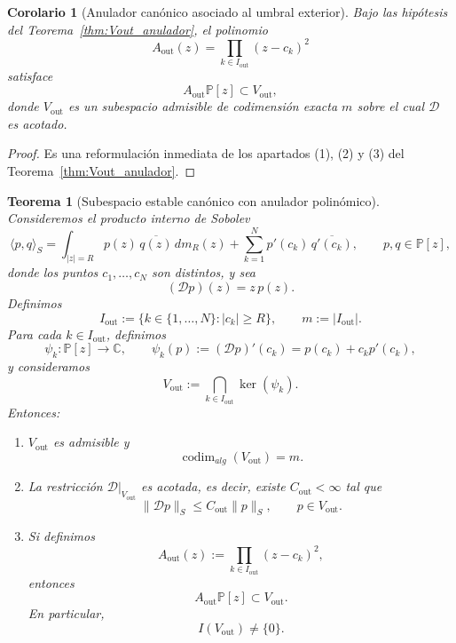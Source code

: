 \documentclass[12pt,a4paper]{article}
\newtheorem{theorem}{Teorema}
\newtheorem{corollary}{Corolario}
\theoremstyle{definition}
\theoremstyle{remark}
\begin{document}
\begin{corollary}[Anulador canónico asociado al umbral exterior]
	\label{cor:anulador_canonico_umbral}
	Bajo las hipótesis del Teorema~\ref{thm:Vout_anulador}, el polinomio
	\[
		A_{\mathrm{out}}(z)=\prod_{k\in I_{\mathrm{out}}}(z-c_k)^2
	\]
	satisface
	\[
		A_{\mathrm{out}}\mathbb P[z]\subset V_{\mathrm{out}},
	\]
	donde $V_{\mathrm{out}}$ es un subespacio admisible de codimensión exacta $m$
	sobre el cual $\mathcal D$ es acotado.
\end{corollary}

\begin{proof}
	Es una reformulación inmediata de los apartados (1), (2) y (3) del
	Teorema~\ref{thm:Vout_anulador}.
\end{proof}

\begin{theorem}[Subespacio estable canónico con anulador polinómico]
	\label{thm:subespacio_canonico_anulador}
	Consideremos el producto interno de Sobolev
	\[
		\langle p,q\rangle_S
		=
		\int_{|z|=R} p(z)\,\overline{q(z)}\,dm_R(z)
		+
		\sum_{k=1}^N p'(c_k)\,\overline{q'(c_k)},
		\qquad p,q\in\mathbb P[z],
	\]
	donde los puntos $c_1,\dots,c_N$ son distintos, y sea
	\[
		(\mathcal Dp)(z)=z\,p(z).
	\]
	Definimos
	\[
		I_{\mathrm{out}}:=\{k\in\{1,\dots,N\}:|c_k|\ge R\},
		\qquad
		m:=|I_{\mathrm{out}}|.
	\]
	Para cada $k\in I_{\mathrm{out}}$, definimos
	\[
		\psi_k:\mathbb P[z]\to\mathbb C,
		\qquad
		\psi_k(p):=(\mathcal Dp)'(c_k)=p(c_k)+c_kp'(c_k),
	\]
	y consideramos
	\[
		V_{\mathrm{out}}
		:=
		\bigcap_{k\in I_{\mathrm{out}}}\ker(\psi_k).
	\]
	Entonces:

	\begin{enumerate}
		\item $V_{\mathrm{out}}$ es admisible y
		      \[
			      \operatorname{codim}_{alg}(V_{\mathrm{out}})=m.
		      \]

		\item La restricción $\mathcal D|_{V_{\mathrm{out}}}$ es acotada, es decir, existe
		      $C_{\mathrm{out}}<\infty$ tal que
		      \[
			      \|\mathcal Dp\|_S\le C_{\mathrm{out}}\|p\|_S,
			      \qquad p\in V_{\mathrm{out}}.
		      \]

		\item Si definimos
		      \[
			      A_{\mathrm{out}}(z):=\prod_{k\in I_{\mathrm{out}}}(z-c_k)^2,
		      \]
		      entonces
		      \[
			      A_{\mathrm{out}}\mathbb P[z]\subset V_{\mathrm{out}}.
		      \]
		      En particular,
		      \[
			      I(V_{\mathrm{out}})\neq\{0\}.
		      \]
	\end{enumerate}
\end{theorem}
\end{document}
